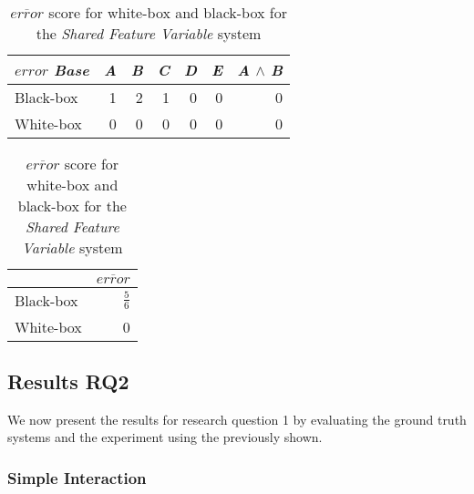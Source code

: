         \begin{table}[H]
            \begin{minipage}{.5\linewidth}
                \centering
                \begin{tabular}{lrrrrrr}    \toprule
                $error$    \emph{Base} & \emph{A} & \emph{B} & \emph{C} & \emph{D} & \emph{E} & \emph{A} $\land$ \emph{B}   \\ \midrule
                Black-box & 1 & 2 & 1 & 0 & 0 & 0       \\
                White-box & 0 & 0 & 0 & 0 & 0 & 0      \\ \bottomrule
                \end{tabular}
                \caption{Respective \emph{error} scores for white-box and black-box {\perfInfluenceModel}s for the \emph{Shared Feature Variable} system.}
                \label{rq1:shared-feature-variable}
            \end{minipage}%
            \hspace{7mm}
        \begin{minipage}{.37\linewidth}
            \centering
            \begin{tabular}{lr}
                \toprule
                            & $\overline{error}$   \\ \midrule
                Black-box & $\frac{5}{6}$              \\
                White-box & 0              \\ \bottomrule
                \end{tabular}
                \caption{$\overline{error}$ score for white-box and black-box for the \emph{Shared Feature Variable} system}
                \label{rq1:shared-feature-variable-mean}
            \end{minipage}
        \end{table}


\subsection{Results RQ2}

We now present the results for research question 1 by evaluating the ground truth systems and the experiment using the {\perfInfluenceModel} 
previously shown.

\subsubsection*{Simple Interaction}


